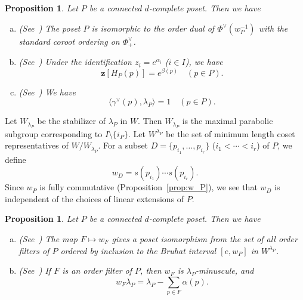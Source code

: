 \documentclass[10pt]{amsart}
\newtheorem{prop}[theo]{Proposition}
\theoremstyle{definition}
\theoremstyle{remark}
\newcommand\vectz{\boldsymbol{z}}
\begin{document}
\begin{prop}
\label{prop:root}
Let $P$ be a connected $d$-complete poset. Then we have
\begin{enumerate}[(a)]
\item\label{prop2.10_a} %
\textup{(See~\cite[Proposition~3.1 and Theorem~5.5]{Stem2})}
The poset $P$ is isomorphic to the order dual of $\Phi^\vee(w_P^{-1})$ 
with the standard coroot ordering on $\Phi^\vee_+$.
\item\label{prop2.10_b} %
\textup{(See~\cite[Lemma~IV]{Proc3})}
Under the identification $z_i = e^{\alpha_i}$ \textup{(}$i \in I$\textup{)}, we have
$$
\vectz[H_P(p)] = e^{\beta(p)}
\quad(p \in P).
$$
\item\label{prop2.10_c} %
\textup{(See~\cite[Proposition~5.1]{Stem2})}
We have
$$
\langle \gamma^\vee(p), \lambda_P \rangle = 1
\quad(p \in P).
$$
\end{enumerate}
\end{prop}

Let $W_{\lambda_P}$ be the stabilizer of $\lambda_P$ in $W$.
Then $W_{\lambda_P}$ is the maximal parabolic subgroup corresponding to $I \setminus \{ i_P \}$.
Let $W^{\lambda_P}$ be the set of minimum length coset representatives of $W/W_{\lambda_P}$.
For a subset $D = \{ p_{i_1}, \ldots, p_{i_r} \}$ ($i_1 < \cdots < i_r$) of $P$, we define
\begin{equation}
\label{eq:w_D}
w_D = s(p_{i_1}) \cdots s(p_{i_r}).
\end{equation}
Since $w_P$ is fully commutative (Proposition~\ref{prop:w_P}), 
we see that $w_D$ is independent of the choices of linear extensions of $P$.

\begin{prop}
\label{prop:Weyl}
Let $P$ be a connected $d$-complete poset.
Then we have
\begin{enumerate}[(a)]
\item\label{prop2.11_a} %
\textup{(See~\cite[Proposition~I]{Proc3})}
The map $F \mapsto w_F$ gives a poset isomorphism 
from the set of all order filters of $P$ ordered by inclusion 
to the Bruhat interval $[e,w_P]$ in $W^{\lambda_P}$.
\item\label{prop2.11_b} %
\textup{(See~\cite[Remark~2.7~(b)]{Stem2})}
If $F$ is an order filter of $P$, then $w_F$ is $\lambda_P$-minuscule, and
$$
w_F \lambda_P = \lambda_P - \sum_{p \in F} \alpha(p).
$$
\end{enumerate}
\end{prop}
\end{document}
